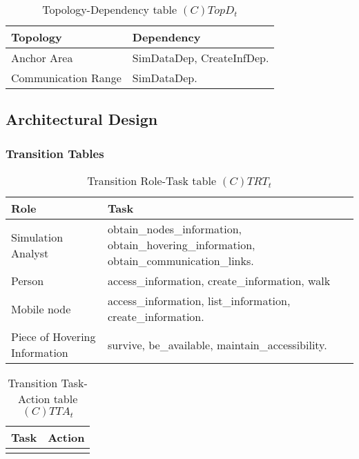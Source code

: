 \begin{table}[H]
	\centering
	\begin{tabular}{|p{4cm}|p{8cm}|}
			\hline
			\textbf{Topology} & \textbf{Dependency} \\
			\hline
			Anchor Area & SimDataDep, CreateInfDep.\\
			\hline
			Communication Range & SimDataDep. \\
			\hline
		\end{tabular}
	\caption{Topology-Dependency table $(C)TopD_t$}
	\label{tab:ctopdt}
\end{table}

\subsection{Architectural Design}

\subsubsection*{Transition Tables}

\begin{table}[H]
	\centering
	\begin{tabular}{|p{4cm}|p{8cm}|}
			\hline
			\textbf{Role} & \textbf{Task} \\
			\hline
			Simulation Analyst & obtain\_nodes\_information,
			obtain\_hovering\_information, obtain\_communication\_links.   \\
			\hline
			Person & access\_information, create\_information, walk \\
			\hline
			Mobile node & access\_information, list\_information, create\_information. \\
			\hline
			Piece of Hovering Information & survive, be\_available, maintain\_accessibility. \\
			\hline
		\end{tabular}
	\caption{Transition Role-Task table $(C)TRT_t$}
	\label{tab:ctrtt}
\end{table}

\begin{table}[H]
	\centering
	\begin{tabular}{|p{4cm}|p{8cm}|}
			\hline
			\textbf{Task} & \textbf{Action} \\
			\hline
			& \\
			\hline
		\end{tabular}
	\caption{Transition Task-Action table $(C)TTA_t$}
	\label{tab:cttat}
\end{table}

